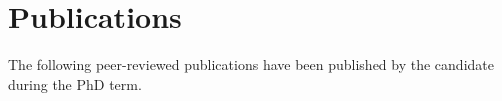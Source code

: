 
{}
\chapter*{Publications}

\manualmark
{}

\noindent The following peer-reviewed publications have been published by the candidate during the PhD term.
%
\begin{refsection}
    \nocite{*} %
    \printbibliography[heading=none,keyword=own]
\end{refsection}


\vfill
